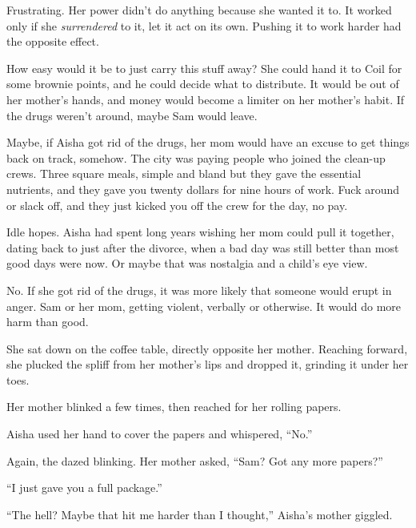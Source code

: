 Frustrating.  Her power didn't do anything because she wanted it to.  It worked only if she \emph{surrendered} to it, let it act on its own.  Pushing it to work harder had the opposite effect.



How easy would it be to just carry this stuff away?  She could hand it to Coil for some brownie points, and he could decide what to distribute.  It would be out of her mother's hands, and money would become a limiter on her mother's habit.  If the drugs weren't around, maybe Sam would leave.



Maybe, if Aisha got rid of the drugs, her mom would have an excuse to get things back on track, somehow.  The city was paying people who joined the clean-up crews.  Three square meals, simple and bland but they gave the essential nutrients, and they gave you twenty dollars for nine hours of work.  Fuck around or slack off, and they just kicked you off the crew for the day, no pay.



Idle hopes.  Aisha had spent long years wishing her mom could pull it together, dating back to just after the divorce, when a bad day was still better than most good days were now.  Or maybe that was nostalgia and a child's eye view.



No.  If she got rid of the drugs, it was more likely that someone would erupt in anger.  Sam or her mom, getting violent, verbally or otherwise.  It would do more harm than good.



She sat down on the coffee table, directly opposite her mother.  Reaching forward, she plucked the spliff from her mother's lips and dropped it, grinding it under her toes.



Her mother blinked a few times, then reached for her rolling papers.



Aisha used her hand to cover the papers and whispered, ``No.''



Again, the dazed blinking.  Her mother asked, ``Sam?  Got any more papers?''



``I just gave you a full package.''



``The hell?  Maybe that hit me harder than I thought,'' Aisha's mother giggled.



